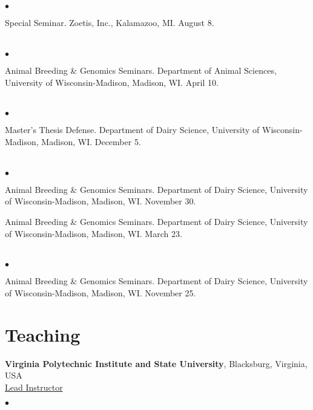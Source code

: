 \documentclass[margin,line,10pt]{res}
\newenvironment{list2}{
  \begin{list}{$\bullet$}{%
      \setlength{\itemsep}{0in}
      \setlength{\parsep}{0in} \setlength{\parskip}{0in}
      \setlength{\topsep}{0in} \setlength{\partopsep}{0in} 
      \setlength{\leftmargin}{0.2in}}}{\end{list}}
\begin{document}
\begin{resume}
\section{}
\begin{list2}
\item  Special Seminar.  Zoetis, Inc., Kalamazoo, MI. August 8. 
\end{list2}  
\section{}
\begin{list2}
 \item Animal Breeding \& Genomics Seminars.  Department of Animal Sciences, University of Wisconsin-Madison, Madison, WI. April 10.
\end{list2}  
\section{}
\begin{list2}
\item  Master's Thesis Defense.  Department of Dairy Science, University of Wisconsin-Madison, Madison, WI. December 5. 
\end{list2}  
\section{}
\begin{list2}
\item Animal Breeding \& Genomics Seminars.  Department of Dairy Science, University of Wisconsin-Madison, Madison, WI. November 30.
\vspace{0.25cm}
\item Animal Breeding \& Genomics Seminars.  Department of Dairy Science, University of Wisconsin-Madison, Madison, WI. March 23. 
\end{list2}
\section{}
\begin{list2}
\item  Animal Breeding \& Genomics Seminars.  Department of Dairy Science, University of Wisconsin-Madison, Madison, WI. November 25. 
\end{list2}




\vspace{0.5cm}
\section{\sc Teaching}
{\bf Virginia Polytechnic Institute and State University}, Blacksburg, Virginia, USA  \vspace{0.2cm} \\
\underline{Lead Instructor}
\vspace{0.2cm}
\begin{list2}


\end{list2}
\end{resume}
\end{document}
